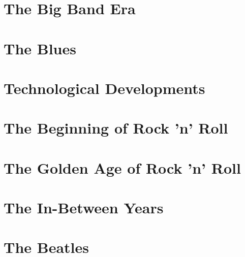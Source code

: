 \documentclass[11pt]{report}
\begin{document}
\chapter{The Big Band Era}
\chapter{The Blues}
\chapter{Technological Developments}
\chapter{The Beginning of Rock 'n' Roll}
\chapter{The Golden Age of Rock 'n' Roll}
\chapter{The In-Between Years}
\chapter{The Beatles}
\end{document}
